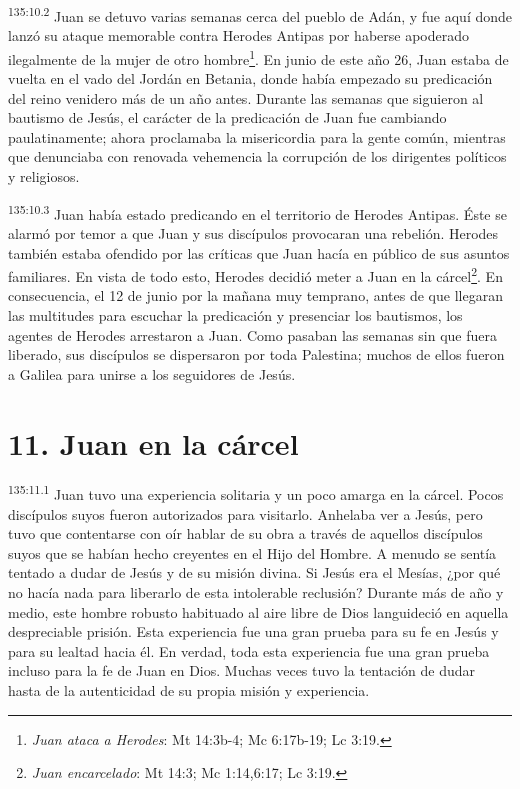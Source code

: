 \par 
\textsuperscript{135:10.2} Juan se detuvo varias semanas cerca del pueblo de Adán, y fue aquí donde lanzó su ataque memorable contra Herodes Antipas por haberse apoderado ilegalmente de la mujer de otro hombre\footnote{\textit{Juan ataca a Herodes}: Mt 14:3b-4; Mc 6:17b-19; Lc 3:19.}. En junio de este año 26, Juan estaba de vuelta en el vado del Jordán en Betania, donde había empezado su predicación del reino venidero más de un año antes. Durante las semanas que siguieron al bautismo de Jesús, el carácter de la predicación de Juan fue cambiando paulatinamente; ahora proclamaba la misericordia para la gente común, mientras que denunciaba con renovada vehemencia la corrupción de los dirigentes políticos y religiosos.

\par 
\textsuperscript{135:10.3} Juan había estado predicando en el territorio de Herodes Antipas. Éste se alarmó por temor a que Juan y sus discípulos provocaran una rebelión. Herodes también estaba ofendido por las críticas que Juan hacía en público de sus asuntos familiares. En vista de todo esto, Herodes decidió meter a Juan en la cárcel\footnote{\textit{Juan encarcelado}: Mt 14:3; Mc 1:14,6:17; Lc 3:19.}. En consecuencia, el 12 de junio por la mañana muy temprano, antes de que llegaran las multitudes para escuchar la predicación y presenciar los bautismos, los agentes de Herodes arrestaron a Juan. Como pasaban las semanas sin que fuera liberado, sus discípulos se dispersaron por toda Palestina; muchos de ellos fueron a Galilea para unirse a los seguidores de Jesús.

\section*{11. Juan en la cárcel}
\par 
\textsuperscript{135:11.1} Juan tuvo una experiencia solitaria y un poco amarga en la cárcel. Pocos discípulos suyos fueron autorizados para visitarlo. Anhelaba ver a Jesús, pero tuvo que contentarse con oír hablar de su obra a través de aquellos discípulos suyos que se habían hecho creyentes en el Hijo del Hombre. A menudo se sentía tentado a dudar de Jesús y de su misión divina. Si Jesús era el Mesías, ¿por qué no hacía nada para liberarlo de esta intolerable reclusión? Durante más de año y medio, este hombre robusto habituado al aire libre de Dios languideció en aquella despreciable prisión. Esta experiencia fue una gran prueba para su fe en Jesús y para su lealtad hacia él. En verdad, toda esta experiencia fue una gran prueba incluso para la fe de Juan en Dios. Muchas veces tuvo la tentación de dudar hasta de la autenticidad de su propia misión y experiencia.

